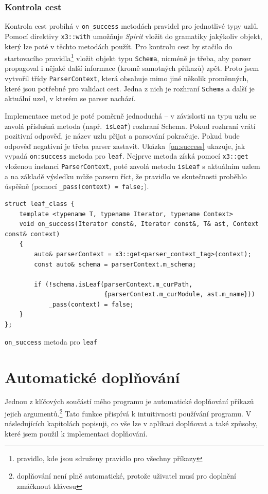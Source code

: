 \documentclass[thesis=B,czech,hidelinks]{FITthesis}[2019/03/06]
\begin{document}
\subsubsection{Kontrola cest}
Kontrola cest probíhá v \verb¨on_success¨ metodách pravidel pro jednotlivé typy uzlů. Pomocí direktivy \texttt{x3::with} umožňuje \textit{Spirit} vložit do gramatiky jakýkoliv objekt, který lze poté v těchto metodách použít. Pro kontrolu cest by stačilo do startovacího pravidla\footnote{pravidlo, kde jsou sdruženy pravidlo pro všechny příkazy} vložit objekt typu \texttt{Schema}, nicméně je třeba, aby parser propagoval i nějaké další informace (kromě samotných příkazů) zpět. Proto jsem vytvořil třídy \texttt{ParserContext}, která obsahuje mimo jiné několik proměnných, které jsou potřebné pro validaci cest. Jedna z nich je rozhraní \texttt{Schema} a další je aktuální uzel, v kterém se parser nachází.

Implementace metod je poté poměrně jednoduchá -- v závislosti na typu uzlu se zavolá příslušná metoda (např.\ \texttt{isLeaf}) rozhraní Schema. Pokud rozhraní vrátí pozitivní odpověď, je název uzlu přijat a parsování pokračuje. Pokud bude odpověď negativní je třeba parser zastavit. Ukázka~\ref{on:success} ukazuje, jak vypadá \verb¨on:success¨ metoda pro \texttt{leaf}. Nejprve metoda získá pomocí \texttt{x3::get} vloženou instanci \texttt{ParserContext}, poté zavolá metodu \texttt{isLeaf} s aktuálním uzlem a na základě výsledku může parseru říct, že pravidlo ve skutečnosti proběhlo úspěšně (pomocí \verb¨_pass(context) = false;¨).

\begin{listing}
\begin{verbatim}
struct leaf_class {
    template <typename T, typename Iterator, typename Context>
    void on_success(Iterator const&, Iterator const&, T& ast, Context const& context)
    {
        auto& parserContext = x3::get<parser_context_tag>(context);
        const auto& schema = parserContext.m_schema;

        if (!schema.isLeaf(parserContext.m_curPath,
                           {parserContext.m_curModule, ast.m_name}))
            _pass(context) = false;
    }
};
\end{verbatim}
\caption{\texttt{on\_success} metoda pro \texttt{leaf}}\label{on-success}
\end{listing}

\section{Automatické doplňování}\label{completion}
Jednou z klíčových součástí mého programu je automatické doplňování příkazů jejich argumentů.\footnote{doplňování není plně automatické, protože uživatel musí pro doplnění zmáčknout klávesu} Tato funkce přispívá k intuitivnosti používání programu. V následujících kapitolách popisuji, co vše lze v aplikaci doplňovat a také způsoby, které jsem použil k implementaci doplňování.
\end{document}
